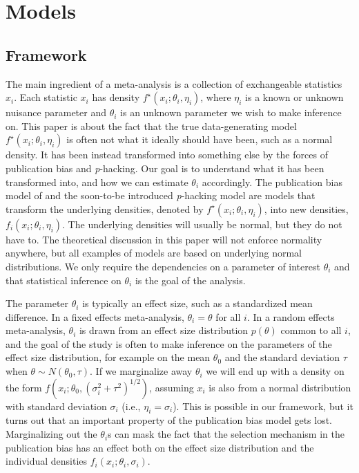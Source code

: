 \documentclass{article}
\theoremstyle{plain}
\theoremstyle{definition}
\renewcommand{\sqrt}[1]{(#1)^{1/2}}
\begin{document}
\section{Models}\label{sect:models}
\subsection{Framework}
The main ingredient of a meta-analysis is a collection of exchangeable statistics $x_{i}$. Each statistic $x_{i}$ has density $f^{\star}(x_{i};\theta_{i},\eta_{i})$, where $\eta_i$ is a known or unknown nuisance parameter and $\theta_{i}$ is an unknown parameter we wish to make inference on. This paper is about the fact that the true data-generating model $f^{\star}(x_{i};\theta_{i},\eta_{i})$ is often not what it ideally should have been, such as a normal density. It has been instead transformed into something else by the forces of publication bias and \textit{p}-hacking. Our goal is to understand what it has been transformed into, and how we can estimate $\theta_{i}$ accordingly. The publication bias model of \citet{hedges1992modeling,iyengar1988selection} and the soon-to-be introduced \textit{p}-hacking model are models that transform the underlying densities, denoted by $f^{\star}(x_{i};\theta_{i},\eta_{i})$, into new densities, $f_{i}(x_{i};\theta_{i},\eta_{i})$. The underlying densities will usually be normal, but they do not have to. The theoretical discussion in this paper will not enforce normality anywhere, but all examples of models are based on underlying normal distributions. We only require the dependencies on a parameter of interest $\theta_{i}$ and that statistical inference on $\theta_{i}$ is the goal of the analysis.

The parameter $\theta_{i}$ is typically an effect size, such as a standardized mean difference. In a fixed effects meta-analysis, $\theta_{i}=\theta$ for all $i$. In a random effects meta-analysis, $\theta_{i}$ is drawn from an effect size distribution $p(\theta)$ common to all $i$, and the goal of the study is often to make inference on the parameters of the effect size distribution, for example on the mean $\theta_{0}$ and the standard deviation $\tau$ when $\theta \sim N(\theta_{0},\tau)$. If we marginalize away $\theta_{i}$ we will end up with a density on the form $f(x_{i}; \theta_{0},\sqrt{\sigma_{i}^{2}+\tau^{2}})$, assuming $x_{i}$ is also from a normal distribution with standard deviation $\sigma_{i}$ (i.e., $\eta_i = \sigma_i$). This is possible in our framework, but it turns out that an important property of the publication bias model gets lost. Marginalizing out the $\theta_{i}$s can mask the fact that the selection mechanism in the publication bias has an effect both on the effect size distribution and the individual densities $f_{i}(x_{i};\theta_i, \sigma_i)$.
\end{document}
